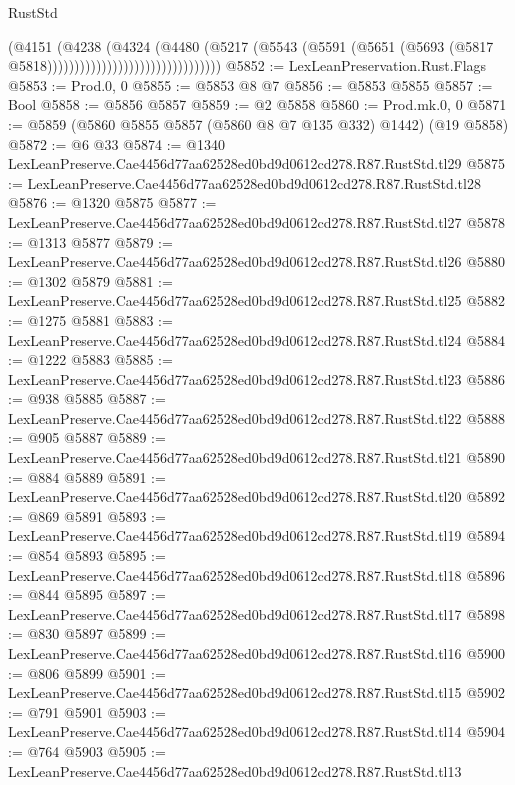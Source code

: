 \begin{lexlean}{RustStd}
\begin{coremodule}
{{                                                (@4151
                                                  (@4238
                                                    (@4324
                                                      (@4480
                                                        (@5217
                                                          (@5543
                                                            (@5591
                                                              (@5651
                                                                (@5693
                                                                  (@5817
                                                                    @5818))))))))))))))))))))))))))))))))
@5852 := LexLeanPreservation.Rust.Flags
@5853 := Prod.{0, 0}
@5855 := @5853 @8 @7
@5856 := @5853 @5855
@5857 := Bool
@5858 := @5856 @5857
@5859 := @2 @5858
@5860 := Prod.mk.{0, 0}
@5871 := @5859 (@5860 @5855 @5857 (@5860 @8 @7 @135 @332) @1442) (@19 @5858)
@5872 := @6 @33
@5874 := @1340 LexLeanPreserve.Cae4456d77aa62528ed0bd9d0612cd278.R87.RustStd.tl29
@5875 := LexLeanPreserve.Cae4456d77aa62528ed0bd9d0612cd278.R87.RustStd.tl28
@5876 := @1320 @5875
@5877 := LexLeanPreserve.Cae4456d77aa62528ed0bd9d0612cd278.R87.RustStd.tl27
@5878 := @1313 @5877
@5879 := LexLeanPreserve.Cae4456d77aa62528ed0bd9d0612cd278.R87.RustStd.tl26
@5880 := @1302 @5879
@5881 := LexLeanPreserve.Cae4456d77aa62528ed0bd9d0612cd278.R87.RustStd.tl25
@5882 := @1275 @5881
@5883 := LexLeanPreserve.Cae4456d77aa62528ed0bd9d0612cd278.R87.RustStd.tl24
@5884 := @1222 @5883
@5885 := LexLeanPreserve.Cae4456d77aa62528ed0bd9d0612cd278.R87.RustStd.tl23
@5886 := @938 @5885
@5887 := LexLeanPreserve.Cae4456d77aa62528ed0bd9d0612cd278.R87.RustStd.tl22
@5888 := @905 @5887
@5889 := LexLeanPreserve.Cae4456d77aa62528ed0bd9d0612cd278.R87.RustStd.tl21
@5890 := @884 @5889
@5891 := LexLeanPreserve.Cae4456d77aa62528ed0bd9d0612cd278.R87.RustStd.tl20
@5892 := @869 @5891
@5893 := LexLeanPreserve.Cae4456d77aa62528ed0bd9d0612cd278.R87.RustStd.tl19
@5894 := @854 @5893
@5895 := LexLeanPreserve.Cae4456d77aa62528ed0bd9d0612cd278.R87.RustStd.tl18
@5896 := @844 @5895
@5897 := LexLeanPreserve.Cae4456d77aa62528ed0bd9d0612cd278.R87.RustStd.tl17
@5898 := @830 @5897
@5899 := LexLeanPreserve.Cae4456d77aa62528ed0bd9d0612cd278.R87.RustStd.tl16
@5900 := @806 @5899
@5901 := LexLeanPreserve.Cae4456d77aa62528ed0bd9d0612cd278.R87.RustStd.tl15
@5902 := @791 @5901
@5903 := LexLeanPreserve.Cae4456d77aa62528ed0bd9d0612cd278.R87.RustStd.tl14
@5904 := @764 @5903
@5905 := LexLeanPreserve.Cae4456d77aa62528ed0bd9d0612cd278.R87.RustStd.tl13
}}
\end{coremodule}
\end{lexlean}
